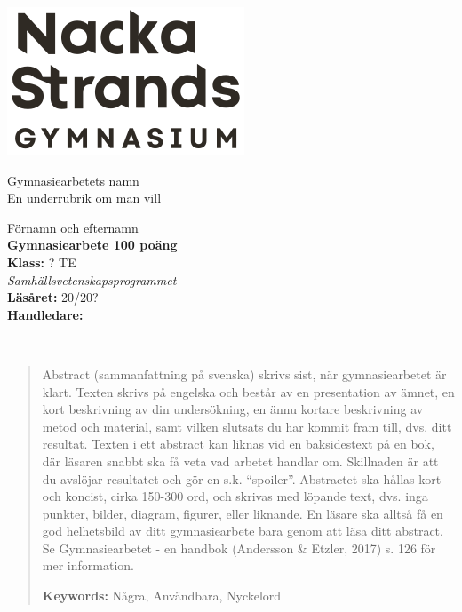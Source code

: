 \documentclass[11pt, a4paper, titlepage]{article}
\begin{document}
	\begin{titlepage}
		\noindent
		\includegraphics[width=0.15\paperwidth]{logo-mg.png} %
		
		\vspace*{0.5\paperwidth} %
		\noindent\hspace*{0.15\paperwidth} %
		\begin{minipage}{\textwidth}
		
			\color[HTML]{0b5394}\Huge Gymnasiearbetets namn \\
			\color{black}\Large En underrubrik om man vill \\
		\end{minipage}
	
		\vfill %
		\noindent
		\begin{minipage}{\textwidth}
			\normalsize %
			Förnamn och efternamn \\
			\textbf{Gymnasiearbete 100 poäng} \\
			\textbf{Klass:} ? TE \\
			\textit{Samhällsvetenskapsprogrammet} \\
			\textbf{Läsåret:} 20/20? \\
			\textbf{Handledare:}
		\end{minipage}
	\end{titlepage}
	\newpage \ \newpage
	\begin{abstract}
		Abstract (sammanfattning på svenska) skrivs sist, när gymnasiearbetet är klart. Texten skrivs på engelska och består av en presentation av ämnet, en kort beskrivning av din undersökning, en ännu kortare beskrivning av metod och material, samt vilken slutsats du har kommit fram till, dvs. ditt resultat. Texten i ett abstract kan liknas vid en baksidestext på en bok, där läsaren snabbt ska få veta vad arbetet handlar om. Skillnaden är att du avslöjar resultatet och gör en s.k. “spoiler”. Abstractet ska hållas kort och koncist, cirka 150-300 ord, och skrivas med löpande text, dvs. inga punkter, bilder, diagram, figurer, eller liknande. En läsare ska alltså få en god helhetsbild av ditt gymnasiearbete bara genom att läsa ditt abstract.
		\newline\newline
		Se Gymnasiearbetet - en handbok (Andersson \& Etzler, 2017) s. 126 för mer information. 
		
		\begin{flushleft}
			{\small {\bf Keywords:} Några, Användbara, Nyckelord}
		\end{flushleft}
	\end{abstract}
\end{document}
